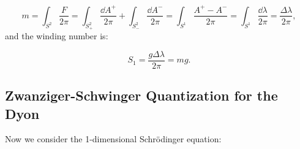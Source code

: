 \documentclass[main.tex]{subfiles}
\begin{document}
\begin{equation}
m=\int_{S^2}\frac{F}{2\pi}=\int_{S^2_+}\frac{\dd{A}^+}{2\pi}+\int_{S^2_-}\frac{\dd{A}^-}{2\pi}=\int_{S^1}\frac{A^+-A^-}{2\pi}=\int_{S^1}\frac{\dd{\lambda}}{2\pi}=\frac{\Delta\lambda}{2\pi},
\end{equation}
and the winding number is:

\begin{equation}
S_1=\frac{g\Delta\lambda}{2\pi}=mg.
\end{equation}
\subsection{Zwanziger-Schwinger Quantization for the Dyon}

Now we consider the 1-dimensional Schrödinger equation:
\end{document}
